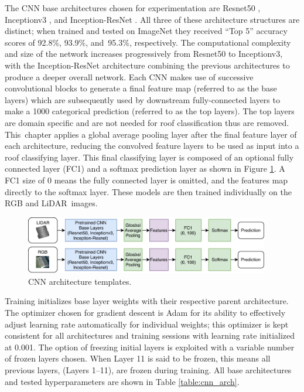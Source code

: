 The \ac{CNN} base architectures chosen for experimentation are Resnet50 \cite{he_deep_2016}, Inceptionv3 \cite{szegedy_rethinking_2016}, and Inception-ResNet \cite{szegedy_inception-v4_2017}.  All three of these architecture structures are distinct; when trained and tested on ImageNet \cite{russakovsky_imagenet_2015} they received ``Top    5'' accuracy scores of 92.8\%,   93.9\%, and~95.3\%, respectively.
The computational complexity and size of the network increases progressively from Resnet50  %
to Inceptionv3, with the Inception-ResNet architecture combining the previous architectures to produce a deeper overall network.   Each \ac{CNN} makes use of successive convolutional blocks to generate a final feature map (referred to as the base layers) which are subsequently used by downstream fully-connected layers to make a 1000 categorical prediction (referred to as the top layers). The top layers are domain specific and are not needed for roof classification thus are removed. This~chapter applies a global average pooling layer after the final feature layer of each architecture, reducing the convolved feature layers to be used as input into a roof classifying layer.  This final classifying layer is composed of an optional fully connected layer (FC1) and a softmax prediction layer as shown in Figure \ref{fig:cnn_architectures}. A FC1 size of 0 means the fully connected layer is omitted, and the features map directly to the softmax layer.  These models are then trained individually on the RGB and LiDAR~images.

\begin{figure}[h]
\centering
\includegraphics[width=0.95\textwidth]{chapter_4_roofshape/imgs/CNN_Template.pdf}
\caption[\ac{CNN} architecture templates]{CNN architecture templates.}
\label{fig:cnn_architectures}
\end{figure}

Training initializes base layer weights with their respective parent architecture. The optimizer chosen for gradient descent is Adam \cite{kingma_adam_2017} for its ability to effectively adjust learning rate automatically for individual weights; this optimizer is kept consistent for all architectures and training sessions with learning rate initialized at 0.001. The option of freezing initial layers is exploited with a variable number of frozen layers chosen. When Layer 11 is said to be frozen, this means all previous layers, (Layers 1--11), are frozen during training. All base architectures and tested hyperparameters are shown in Table \ref{table:cnn_arch}.  



